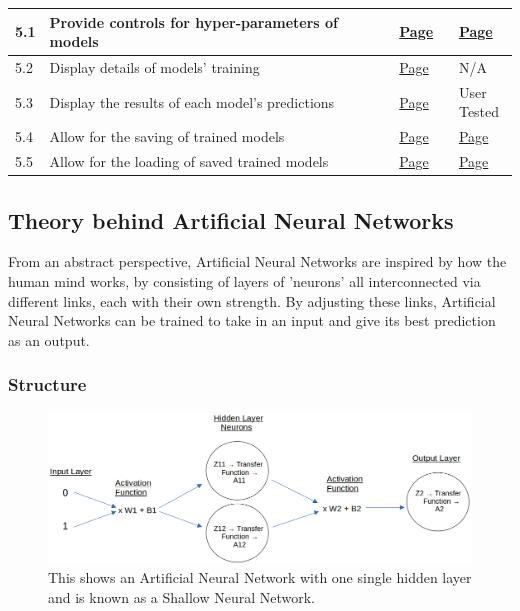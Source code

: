 \documentclass[./project-report/src/latex/project-report.tex]{subfiles}
\begin{document}
\begin{tabular}{|p{0.03\linewidth}|p{0.73\linewidth}|p{0.12\linewidth}|p{0.12\linewidth}|}
      \hline
      5.1 & Provide controls for hyper-parameters of models & \hyperref[sec:create_model-module]{Page \pageref{sec:create_model-module}} & \hyperref[sec:hyper-parameter-frame-input-validation]{Page \pageref{sec:hyper-parameter-frame-input-validation}} \\  %
      \hline
      5.2 & Display details of models' training & \hyperref[sec:create_model-module]{Page \pageref{sec:create_model-module}} & N/A \\
      \hline
      5.3 & Display the results of each model's predictions & \hyperref[sec:test_model-module]{Page \pageref{sec:test_model-module}} & User Tested \\
      \hline
      5.4 & Allow for the saving of trained models & \hyperref[sec:test_model-module]{Page \pageref{sec:test_model-module}} & \hyperref[sec:test-frames-input-validation]{Page \pageref{sec:test-frames-input-validation}} \\
      \hline
      5.5 & Allow for the loading of saved trained models & \hyperref[sec:load_model-module]{Page \pageref{sec:load_model-module}} & \hyperref[sec:load-model-frame-input-validation]{Page \pageref{sec:load-model-frame-input-validation}} \\
      \hline
\end{tabular}

\subsection{Theory behind Artificial Neural Networks}
\label{sec:ann-theory}

From an abstract perspective, Artificial Neural Networks are inspired by how the human mind works, by consisting of layers of 'neurons' all interconnected via 
different links, each with their own strength. By adjusting these links, Artificial Neural Networks can be trained to take in an input and give its best 
prediction as an output.
\vspace{5mm}

\subsubsection{Structure}

\begin{figure}[h!]
\centering
\includegraphics[width=1\textwidth]{./project-report/src/images/shallow-ann-diagram.png}
\caption{This shows an Artificial Neural Network with one single hidden layer and is known as a Shallow Neural Network.}
\end{figure}
\end{document}
